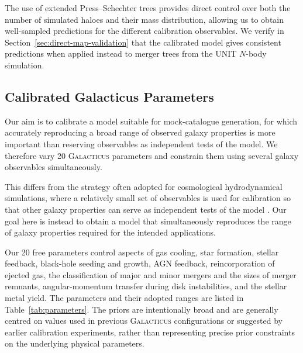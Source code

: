 \documentclass[twocolumn, apj, numberedappendix, iop]{openjournal}
\newcommand{\galacticus}{\textsc{Galacticus}\xspace}
\begin{document}
The use of extended Press--Schechter trees provides direct control over both
the number of simulated haloes and their mass distribution, allowing us to
obtain well-sampled predictions for the different calibration observables.
We verify in Section~\ref{sec:direct-map-validation} that the calibrated model gives
consistent predictions when applied instead to merger trees from the UNIT $N$-body
simulation.

\subsection{Calibrated Galacticus Parameters}
\label{sec:varied-parameters}

Our aim is to calibrate a model suitable for mock-catalogue generation, for which accurately reproducing a broad range of observed galaxy properties is more important than reserving observables as independent tests of the model. We therefore vary 20 \galacticus{} parameters and constrain them using several galaxy observables simultaneously.

This differs from the strategy often adopted for cosmological hydrodynamical
simulations, where a relatively small set of observables is used for
calibration so that other galaxy properties can serve as independent tests
of the model \citep[e.g.][]{2015MNRAS.446..521S, 2018MNRAS.475..624N, 2026MNRAS.548ag375S}. Our goal here is instead to obtain a model
that simultaneously reproduces the range of galaxy properties required for
the intended applications.

Our 20 free parameters control aspects of gas cooling, star formation, stellar feedback, black-hole seeding and growth, AGN feedback,
reincorporation of ejected gas, the classification of major and minor
mergers and the sizes of merger remnants, angular-momentum transfer during
disk instabilities, and the stellar metal yield. The parameters and their adopted ranges are listed in Table~\ref{tab:parameters}. The priors are intentionally broad and are generally centred on values used
in previous \galacticus{} configurations or suggested by earlier calibration
experiments, rather than representing precise prior constraints on the
underlying physical parameters.
\end{document}
